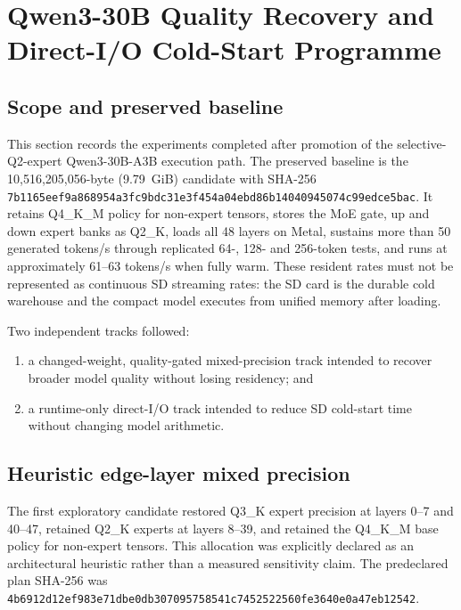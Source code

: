 
\section{Qwen3-30B Quality Recovery and Direct-I/O Cold-Start Programme}
\label{sec:qwen30b-quality-dio-2026-09-09}

\subsection{Scope and preserved baseline}

This section records the experiments completed after promotion of the
selective-Q2-expert Qwen3-30B-A3B execution path.  The preserved baseline is
the 10,516,205,056-byte (9.79~GiB) candidate with SHA-256
\texttt{7b1165eef9a868954a3fc9bdc31e3f454a04ebd86b14040945074c99edce5bac}.
It retains Q4\_K\_M policy for non-expert tensors, stores the MoE gate, up and
down expert banks as Q2\_K, loads all 48 layers on Metal, sustains more than
50 generated tokens/s through replicated 64-, 128- and 256-token tests, and
runs at approximately 61--63 tokens/s when fully warm.  These resident rates
must not be represented as continuous SD streaming rates: the SD card is the
durable cold warehouse and the compact model executes from unified memory
after loading.

Two independent tracks followed:
\begin{enumerate}
  \item a changed-weight, quality-gated mixed-precision track intended to
        recover broader model quality without losing residency; and
  \item a runtime-only direct-I/O track intended to reduce SD cold-start time
        without changing model arithmetic.
\end{enumerate}

\subsection{Heuristic edge-layer mixed precision}

The first exploratory candidate restored Q3\_K expert precision at layers
0--7 and 40--47, retained Q2\_K experts at layers 8--39, and retained the
Q4\_K\_M base policy for non-expert tensors.  This allocation was explicitly
declared as an architectural heuristic rather than a measured sensitivity
claim.  The predeclared plan SHA-256 was
\texttt{4b6912d12ef983e71dbe0db307095758541c7452522560fe3640e0a47eb12542}.

